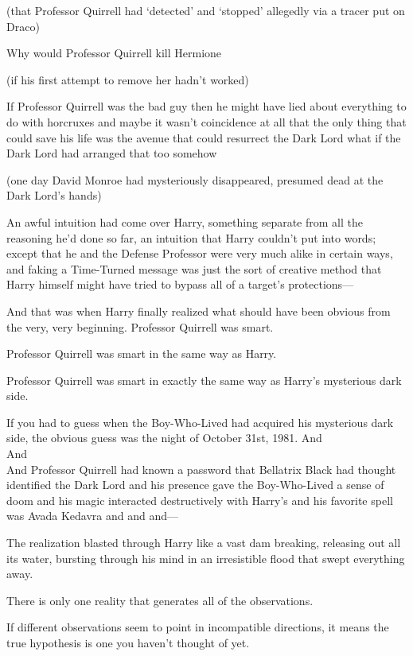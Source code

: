 (that Professor Quirrell had `detected' and `stopped' allegedly via a tracer
put on Draco)

Why would Professor Quirrell kill Hermione

(if his first attempt to remove her hadn't worked)

If Professor Quirrell was the bad guy then he might have lied about everything
to do with horcruxes and maybe it wasn't coincidence at all that the only thing
that could save his life was the avenue that could resurrect the Dark Lord what
if the Dark Lord had arranged that too somehow

(one day David Monroe had mysteriously disappeared, presumed dead at the Dark
Lord's hands)

An awful intuition had come over Harry, something separate from all the
reasoning he'd done so far, an intuition that Harry couldn't put into words;
except that he and the Defense Professor were very much alike in certain ways,
and faking a Time-Turned message was just the sort of creative method that
Harry himself might have tried to bypass all of a target's protections—

And that was when Harry finally realized what should have been obvious from the
very, very beginning.
\sbreak
Professor Quirrell was smart.

Professor Quirrell was smart in the same way as Harry.

Professor Quirrell was smart in exactly the same way as Harry's mysterious dark
side.

If you had to guess when the Boy-Who-Lived had acquired his mysterious dark
side, the obvious guess was the night of October 31st, 1981.
\sbreak
And\\
And\\
And Professor Quirrell had known a password that Bellatrix Black had thought
identified the Dark Lord and his presence gave the Boy-Who-Lived a sense of
doom and his magic interacted destructively with Harry's and his favorite spell
was Avada Kedavra and and and—

The realization blasted through Harry like a vast dam breaking, releasing out
all its water, bursting through his mind in an irresistible flood that swept
everything away.

There is only one reality that generates all of the observations.

If different observations seem to point in incompatible directions, it means
the true hypothesis is one you haven't thought of yet.

